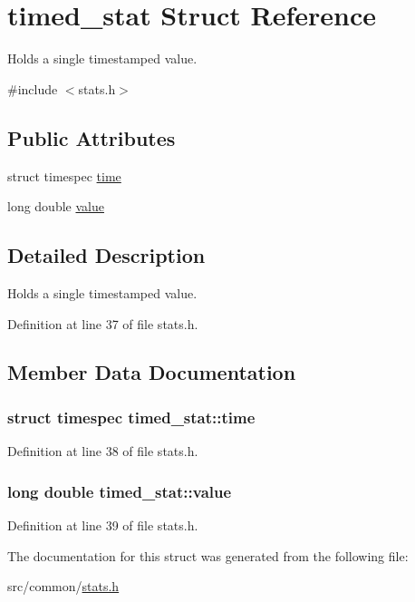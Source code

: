 \hypertarget{structtimed__stat}{\section{timed\-\_\-stat Struct Reference}
\label{structtimed__stat}
}


Holds a single timestamped value.  




{\ttfamily \#include $<$stats.\-h$>$}

\subsection*{Public Attributes}
\begin{DoxyCompactItemize}
\item 
struct timespec \hyperlink{structtimed__stat_a3a88c0e270956c54a1017512206a25e0}{time}
\item 
long double \hyperlink{structtimed__stat_a8b13393299e896ec17e28f696ac99631}{value}
\end{DoxyCompactItemize}


\subsection{Detailed Description}
Holds a single timestamped value. 

Definition at line 37 of file stats.\-h.



\subsection{Member Data Documentation}
\hypertarget{structtimed__stat_a3a88c0e270956c54a1017512206a25e0}{
\subsubsection[{time}]{\setlength{\rightskip}{0pt plus 5cm}struct timespec timed\-\_\-stat\-::time}}\label{structtimed__stat_a3a88c0e270956c54a1017512206a25e0}


Definition at line 38 of file stats.\-h.

\hypertarget{structtimed__stat_a8b13393299e896ec17e28f696ac99631}{
\subsubsection[{value}]{\setlength{\rightskip}{0pt plus 5cm}long double timed\-\_\-stat\-::value}}\label{structtimed__stat_a8b13393299e896ec17e28f696ac99631}


Definition at line 39 of file stats.\-h.



The documentation for this struct was generated from the following file\-:\begin{DoxyCompactItemize}
\item 
src/common/\hyperlink{stats_8h}{stats.\-h}\end{DoxyCompactItemize}
